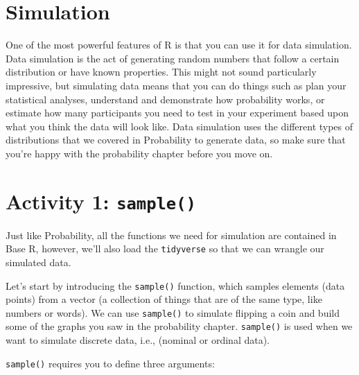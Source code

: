 \documentclass[
  oneside]{book}
\begin{document}
\hypertarget{simulation-1}{%
\section{Simulation}\label{simulation-1}}

One of the most powerful features of R is that you can use it for data simulation. Data simulation is the act of generating random numbers that follow a certain distribution or have known properties. This might not sound particularly impressive, but simulating data means that you can do things such as plan your statistical analyses, understand and demonstrate how probability works, or estimate how many participants you need to test in your experiment based upon what you think the data will look like. Data simulation uses the different types of distributions that we covered in Probability to generate data, so make sure that you're happy with the probability chapter before you move on.

\hypertarget{activity-1-sample}{%
\section{\texorpdfstring{Activity 1: \texttt{sample()}}{Activity 1: sample()}}\label{activity-1-sample}}

Just like Probability, all the functions we need for simulation are contained in Base R, however, we'll also load the \texttt{tidyverse} so that we can wrangle our simulated data.

Let's start by introducing the \texttt{sample()} function, which samples elements (data points) from a vector (a collection of things that are of the same type, like numbers or words). We can use \texttt{sample()} to simulate flipping a coin and build some of the graphs you saw in the probability chapter. \texttt{sample()} is used when we want to simulate discrete data, i.e., (nominal or ordinal data).

\texttt{sample()} requires you to define three arguments:
\end{document}
